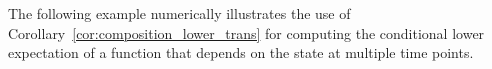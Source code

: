 \documentclass[10pt,a4paper]{paper}
\theoremstyle{definition}
\newcommand{\processes}{\mathbb{P}}
\newcommand{\wprocesses}{\processes^{\mathrm{W}}}
\newcommand{\rateset}{\mathcal{Q}}
\newcommand{\lrate}{\underline{Q}}
\begin{document}




The following example numerically illustrates the use of Corollary~\ref{cor:composition_lower_trans} for computing the conditional lower expectation of a function that depends on the state at multiple time points.
\end{document}
